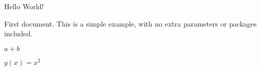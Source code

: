 \documentclass{article}
\begin{document}
Hello World!

First document. This is a simple example, with no 
extra parameters or packages included.

$a+b$

$g(x)=x^2$
\end{document}
